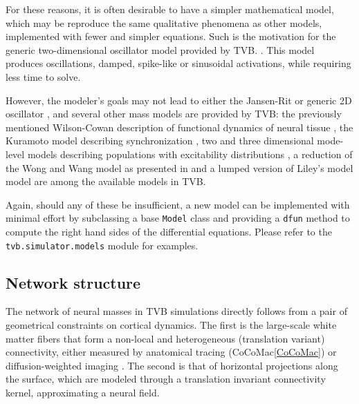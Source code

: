     For these reasons, it is often desirable to have a simpler mathematical 
    model, which may be reproduce the same qualitative phenomena as other 
    models, implemented with fewer and simpler equations. Such is the motivation
    for the generic two-dimensional oscillator model provided by TVB. 
    . This model produces oscillations, damped, spike-like or 
    sinusoidal activations, while requiring less time to solve.

    However, the modeler's goals may not lead to either the Jansen-Rit
    \cite{Jansen_1995, David_2003, David_2004} or generic 2D oscillator
    \cite{FitzHugh_1961, Nagumo_1962}, and several other mass models are
    provided by TVB: the previously mentioned Wilson-Cowan description of
    functional dynamics of neural tissue \cite{Wilson_1972}, the Kuramoto
    model describing synchronization \cite{Kuramoto_1975, Cabral_2011}, two
    and three dimensional mode-level models describing populations with
    excitability distributions \cite{Stefanescu_2011, Stefanescu_2008}, a
    reduction of the Wong and Wang model \cite{Wong_2006} as presented in
    \cite{Deco_2013} and a lumped version of Liley's model \cite{Liley_1999,
    Stey-Ross_1999} model are among the available models in TVB.

    Again, should any of these be insufficient, a new model can be implemented
    with minimal effort by subclassing a base \texttt{Model} class and providing a 
    \texttt{dfun} method to compute the right hand sides of the differential 
    equations. Please refer to the \texttt{tvb.simulator.models} module for 
    examples.
    

\subsection{Network structure}

    The network of neural masses in TVB simulations directly follows from  a
    pair of geometrical constraints on cortical dynamics. The first is the
    large-scale white matter fibers that form a non-local and heterogeneous
    (translation variant) connectivity, either measured by anatomical tracing
    (CoCoMac\ref{CoCoMac}) or diffusion-weighted imaging \cite{Hagmann_2008,
    Honey_2009, Bastiani_2012}. The second is that of horizontal projections
    along the surface, which are modeled through a translation invariant
     connectivity kernel,
    approximating a neural field.

